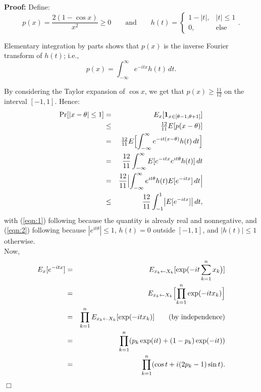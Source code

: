 \documentclass[12pt]{article}
\newenvironment{proof}{\noindent \textbf{Proof:}}{$\Box$}
\newcommand{\infint}{\int_{-\infty}^\infty}
\newcommand{\intunit}{\int_{-1}^1}
\begin{document}
\begin{proof}
Define:
\[p(x) = \frac{2(1-\cos{x})}{x^2} \geq 0\qquad\text{and}\qquad h(t) = \begin{cases} 1-|t|, & |t| 
\leq 1 \\ 0, & \text{else} \end{cases}.\]

\noindent Elementary integration by parts shows that $p(x)$ is the inverse Fourier transform of 
$h(t)$; i.e.,
\[p(x) = \infint e^{-itx} h(t)\,dt.\]

\noindent By considering the Taylor expansion of $\cos{x}$, we get that $p(x) \geq \frac{11}{12}$ 
on the interval $[-1,1]$.  Hence:
\newcommand{\twel}{\frac{12}{11}}
\begin{eqnarray}
\Pr[|x-\theta| \leq 1] & = & E_x[\mathbf{1}_{x \in [\theta-1,\theta+1]}] \nonumber \\
& \leq & {\textstyle \twel} E[p(x-\theta)] \nonumber \\
& = & {\textstyle \twel} E\Bigl[\infint e^{-it(x-\theta)}h(t)\,dt\Bigr] \nonumber \\
& = & \twel \infint E[e^{-itx} e^{it\theta} h(t)]\,dt \nonumber \\
& = & \twel \Bigl|\infint e^{it\theta} h(t) E[e^{-itx}]\,dt\Bigr| \label{eqn:1}\\
& \leq & \twel \intunit \bigl|E[e^{-itx}]\bigr|\,dt, \label{eqn:2}
\end{eqnarray}
with (\ref{eqn:1}) following because the quantity is already real and nonnegative, and 
(\ref{eqn:2}) following because $|e^{it\theta}| \leq 1$, $h(t) = 0$ outside $[-1,1]$, and $|h(t)| 
\leq 1$ otherwise.\\

\noindent Now,
\begin{eqnarray*}
E_x[e^{-itx}] & = & E_{x_k \leftarrow X_k} [\exp (-it\sum_{k=1}^n x_k\bigr)] \\
& = & E_{x_k \leftarrow X_k} \Bigl[\prod_{k=1}^n \exp (-itx_k)\Bigr] \\
& = & \prod_{k=1}^n E_{x_k \leftarrow X_k}[\exp(-itx_k)] \qquad \text{(by independence)}\\
& = & \prod_{k=1}^n (p_k \exp(it) + (1-p_k) \exp(-it)) \\
& = & \prod_{k=1}^n (\cos t + i(2p_k-1)\sin t).
\end{eqnarray*}


\end{proof}
\end{document}
